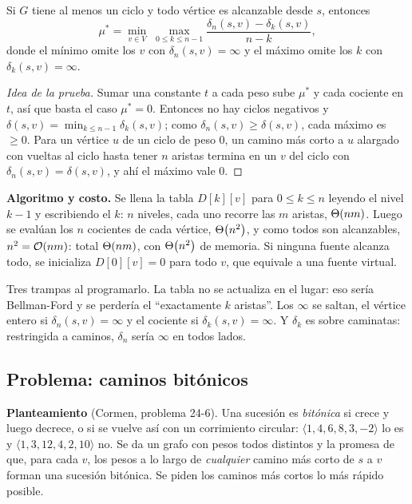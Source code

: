 \documentclass[11pt,letterpaper]{article}
\begin{document}
\begin{teorema}[Karp]\label{teo:caminos-karp}
  Si $G$ tiene al menos un ciclo y todo vértice es alcanzable desde
  $s$, entonces
  \[
    \mu^* = \min_{v \in V} \; \max_{0 \le k \le n - 1}
      \frac{\delta_n(s, v) - \delta_k(s, v)}{n - k} ,
  \]
  donde el mínimo omite los $v$ con $\delta_n(s, v) = \infty$ y el
  máximo omite los $k$ con $\delta_k(s, v) = \infty$.
\end{teorema}

\begin{proof}[Idea de la prueba]
  Sumar una constante $t$ a cada peso sube $\mu^*$ y cada cociente en
  $t$, así que basta el caso $\mu^* = 0$. Entonces no hay ciclos
  negativos y $\delta(s, v) = \min_{k \le n - 1} \delta_k(s, v)$; como
  $\delta_n(s, v) \ge \delta(s, v)$, cada máximo es $\ge 0$. Para un
  vértice $u$ de un ciclo de peso $0$, un camino más corto a $u$
  alargado con vueltas al ciclo hasta tener $n$ aristas termina en un
  $v$ del ciclo con $\delta_n(s, v) = \delta(s, v)$, y ahí el máximo
  vale $0$.
\end{proof}

\textbf{Algoritmo y costo.} Se llena la tabla $D[k][v]$ para
$0 \le k \le n$ leyendo el nivel $k - 1$ y escribiendo el $k$: $n$
niveles, cada uno recorre las $m$ aristas, $\Theta\!\left(nm\right)$. Luego se
evalúan los $n$ cocientes de cada vértice, $\Theta\!\left(n^2\right)$, y como todos
son alcanzables, $n^2 = \mathcal{O}\!\left(nm\right)$: total $\Theta\!\left(nm\right)$, con $\Theta\!\left(n^2\right)$ de
memoria. Si ninguna fuente alcanza todo, se inicializa
$D[0][v] = 0$ para todo $v$, que equivale a una fuente virtual.

\begin{ojo}
  Tres trampas al programarlo. La tabla no se actualiza en el lugar:
  eso sería Bellman-Ford y se perdería el ``exactamente $k$ aristas''.
  Los $\infty$ se saltan, el vértice entero si
  $\delta_n(s, v) = \infty$ y el cociente si $\delta_k(s, v) = \infty$.
  Y $\delta_k$ es sobre caminatas: restringida a caminos, $\delta_n$
  sería $\infty$ en todos lados.
\end{ojo}


\subsection*{Problema: caminos bitónicos}

\textbf{Planteamiento} (Cormen, problema 24-6). Una sucesión es
\emph{bitónica} si crece y luego decrece, o si se vuelve así con un
corrimiento circular: $\langle 1, 4, 6, 8, 3, -2 \rangle$ lo es y
$\langle 1, 3, 12, 4, 2, 10 \rangle$ no. Se da un grafo con pesos todos
distintos y la promesa de que, para cada $v$, los pesos a lo largo de
\emph{cualquier} camino más corto de $s$ a $v$ forman una sucesión
bitónica. Se piden los caminos más cortos lo más rápido posible.
\end{document}
